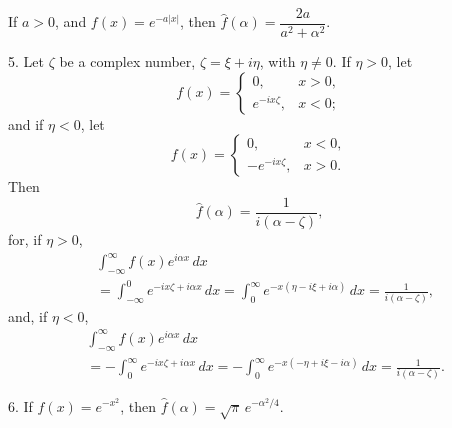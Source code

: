 If $a>0$, and $f(x)=e^{-a|x|}$, then $\hat f(\alpha)=\dfrac{2a}{a^2+\alpha^2}$.

5. Let $\zeta$ be a complex number, $\zeta=\xi+i\eta$, with $\eta\neq 0$. If $\eta>0$, let
\begin{equation*}
f(x)=
\begin{cases}
0,&x>0,\\
e^{-ix\zeta},&x<0;
\end{cases}
\end{equation*}
and if $\eta<0$, let
\begin{equation*}
f(x)=
\begin{cases}
0,&x<0,\\
-e^{-ix\zeta},&x>0.
\end{cases}
\end{equation*}
Then
\begin{equation*}
\hat f(\alpha)=\frac{1}{i(\alpha-\zeta)},
\end{equation*}
for, if $\eta>0$,
\begin{equation*}
\begin{aligned}
&\int_{-\infty}^{\infty}f(x)e^{i\alpha x}\,dx\\
&= \int_{-\infty}^0 e^{-ix\zeta+i\alpha x}\,dx = \int_0^\infty e^{-x(\eta-i\xi+i\alpha)}\,dx = \frac{1}{i(\alpha-\zeta)},
\end{aligned}
\end{equation*}
and, if $\eta<0$,
\begin{equation*}
\begin{aligned}
&\int_{-\infty}^{\infty}f(x)e^{i\alpha x}\,dx\\
&= -  \int_0^\infty e^{-ix\zeta+i\alpha x}\,dx = -  \int_0^\infty e^{-x(-\eta+i\xi-i\alpha)}\,dx = \frac{1}{i(\alpha-\zeta)}.
\end{aligned}
\end{equation*}

6. If $f(x)=e^{-x^2}$, then $\hat f(\alpha)=\sqrt\pi\,e^{-\alpha^2/4}$.

